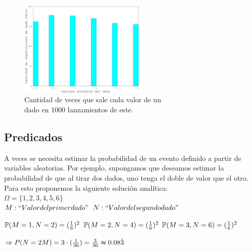 \documentclass{article}
\begin{document}
\begin{figure}[h]
	\centering
	\includegraphics[width=0.55\textwidth]{images/probabilidadesDados.png}
	\caption{Cantidad de veces que sale cada valor de un\\ dado en 1000 lanzamientos de este.}
\end{figure}


\subsection{Predicados}

A veces se necesita estimar la probabilidad de un evento definido a partir de variables aleatorias. Por ejemplo, supongamos que deseamos estimar la probabilidad de que al tirar dos dados, uno tenga el doble de valor que el otro. Para esto proponemos la siguiente solución analítica:\\

\indent $\Omega = \{1,2,3,4,5,6\}$ \\

\indent $M: ``Valor del primer dado"\\$
\indent $N: ``Valor del segundo dado"\\$

\indent $\mathbb{P}(M=1, N=2) = ({1 \over 6})^2\\$
\indent $\mathbb{P}(M=2, N=4) = ({1 \over 6})^2\\$
\indent $\mathbb{P}(M=3, N=6) = ({1 \over 6})^2\\$

\indent $\Rightarrow {P}(N=2M) = 3\cdot({1 \over 36}) = {3 \over 36} \thickapprox 0.08\hat{3}\\$
\end{document}
